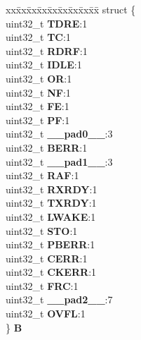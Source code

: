 \begin{DoxyCompactItemize}
\begin{tabbing}
\end{tabbing}\item 
\mbox{\label{unionESCI__tag_1_1ESCI__SR__tag_ad3f21ecc7decc2f8ae31dfa603e8a517}} 
\begin{tabbing}
xx\=xx\=xx\=xx\=xx\=xx\=xx\=xx\=xx\=\kill
struct \{\\
\>uint32\_t {\bfseries TDRE}:1\\
\>uint32\_t {\bfseries TC}:1\\
\>uint32\_t {\bfseries RDRF}:1\\
\>uint32\_t {\bfseries IDLE}:1\\
\>uint32\_t {\bfseries OR}:1\\
\>uint32\_t {\bfseries NF}:1\\
\>uint32\_t {\bfseries FE}:1\\
\>uint32\_t {\bfseries PF}:1\\
\>uint32\_t {\bfseries \_\_pad0\_\_}:3\\
\>uint32\_t {\bfseries BERR}:1\\
\>uint32\_t {\bfseries \_\_pad1\_\_}:3\\
\>uint32\_t {\bfseries RAF}:1\\
\>uint32\_t {\bfseries RXRDY}:1\\
\>uint32\_t {\bfseries TXRDY}:1\\
\>uint32\_t {\bfseries LWAKE}:1\\
\>uint32\_t {\bfseries STO}:1\\
\>uint32\_t {\bfseries PBERR}:1\\
\>uint32\_t {\bfseries CERR}:1\\
\>uint32\_t {\bfseries CKERR}:1\\
\>uint32\_t {\bfseries FRC}:1\\
\>uint32\_t {\bfseries \_\_pad2\_\_}:7\\
\>uint32\_t {\bfseries OVFL}:1\\
\} {\bfseries B}\\


\end{tabbing}
\end{DoxyCompactItemize}
